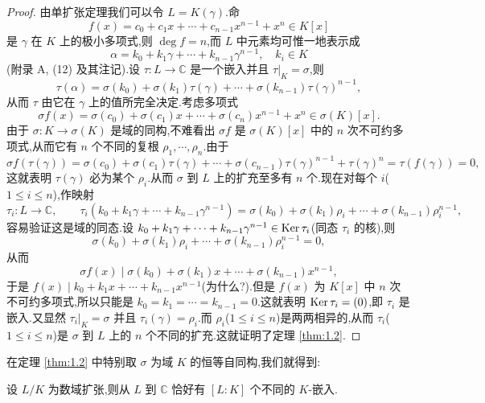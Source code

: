 \begin{proof}
由单扩张定理我们可以令 $L=K(\gamma)$.命
\[
  f(x)=c_0+c_1x+\cdots+c_{n-1}x^{n-1}+x^n\in K[x]
\]
是 $\gamma$ 在 $K$ 上的极小多项式,则 $\deg f=n$,而 $L$ 中元素均可惟一地表示成
\[
  \alpha=k_0+k_1\gamma+\cdots+k_{n-1}\gamma^{n-1},\quad k_i\in K
\]
(附录 A, (12) 及其注记).设 $\tau\colon L\to\mathbb{C}$ 是一个嵌入并且 $\tau|_K=\sigma$,则
\[
  \tau(\alpha)=\sigma(k_0)+\sigma(k_1)\tau(\gamma)+\cdots+\sigma(k_{n-1})\tau(\gamma)^{n-1},
\]
从而 $\tau$ 由它在 $\gamma$ 上的值所完全决定.考虑多项式
\[
  \sigma f(x)=\sigma(c_0)+\sigma(c_1)x+\cdots+\sigma(c_n)x^{n-1}+x^n\in\sigma(K)[x].
\]
由于 $\sigma\colon K\to\sigma(K)$ 是域的同构,不难看出 $\sigma f$ 是 $\sigma(K)[x]$ 中的 $n$ 次不可约多项式,从而它有 $n$ 个不同的复根 $\rho_1,\cdots,\rho_n$.由于
\[
  \sigma f(\tau(\gamma))=\sigma(c_0)+\sigma(c_1)\tau(\gamma)+\cdots+\sigma(c_{n-1})\tau(\gamma)^{n-1}+\tau(\gamma)^n=\tau(f(\gamma))=0,
\]
这就表明 $\tau(\gamma)$ 必为某个 $\rho_i$.从而 $\sigma$ 到 $L$ 上的扩充至多有 $n$ 个.现在对每个 $i$($1\leqslant i\leqslant n$),作映射
\[
  \tau_i\colon L\to\mathbb{C},\qquad
  \tau_i(k_0+k_1\gamma+\cdots+k_{n-1}\gamma^{n-1})
  =\sigma(k_0)+\sigma(k_1)\rho_i+\cdots+\sigma(k_{n-1})\rho_i^{n-1},
\]
容易验证这是域的同态.设 $k_0+k_1\gamma+\cdots+k_{n-1}\gamma^{n-1}\in\operatorname{Ker}\tau_i$(同态 $\tau_i$ 的核),则
\[
  \sigma(k_0)+\sigma(k_1)\rho_i+\cdots+\sigma(k_{n-1})\rho_i^{n-1}=0,
\]
从而
\[
  \sigma f(x)\mid\sigma(k_0)+\sigma(k_1)x+\cdots+\sigma(k_{n-1})x^{n-1},
\]
于是 $f(x)\mid k_0+k_1x+\cdots+k_{n-1}x^{n-1}$(为什么?).但是 $f(x)$ 为 $K[x]$ 中 $n$ 次不可约多项式,所以只能是 $k_0=k_1=\cdots=k_{n-1}=0$.这就表明 $\operatorname{Ker}\tau_i=(0)$,即 $\tau_i$ 是嵌入.又显然 $\tau_i|_K=\sigma$ 并且 $\tau_i(\gamma)=\rho_i$.而 $\rho_i$($1\leqslant i\leqslant n$)是两两相异的,从而 $\tau_i$($1\leqslant i\leqslant n$)是 $\sigma$ 到 $L$ 上的 $n$ 个不同的扩充.这就证明了定理 \ref{thm:1.2}.
\end{proof}

在定理 \ref{thm:1.2} 中特别取 $\sigma$ 为域 $K$ 的恒等自同构,我们就得到:

\begin{corollarynonum}
设 $L/K$ 为数域扩张,则从 $L$ 到 $\mathbb{C}$ 恰好有 $[L:K]$ 个不同的 $K$-嵌入.
\end{corollarynonum}

